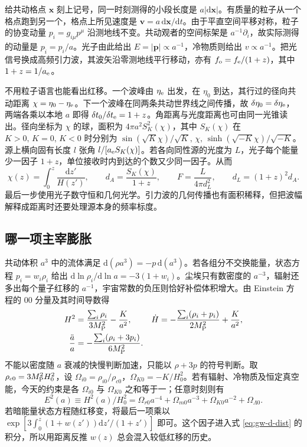 给共动格点 $\bm x$ 刻上记号，同一时刻测得的小段长度是 $a|\mathrm d\bm x|$。有质量的粒子从一个格点跑到另一个，格点上所见速度是 $\bm v=a\,\mathrm d\bm x/\mathrm dt$。由于平直空间平移对称，粒子的协变动量 $p_i=g_{i\mu}p^\mu$ 沿测地线不变。共动观者的空间标架是 $a^{-1}\partial_i$，故实际测得的动量是 $p_{\hat i}=p_i/a$。光子由此给出 $E=|\bm p|\propto a^{-1}$，冷物质则给出 $v\propto a^{-1}$。把光信号换成高频引力波，其波矢沿零测地线平行移动，亦有 $f_{\rm o}=f_{\rm e}/(1+z)$，其中 $1+z=1/a_{\rm e}$。

不用粒子语言也能看出红移。一个波峰由 $\eta_{\rm e}$ 出发，在 $\eta_0$ 到达，其行过的径向共动距离 $\chi=\eta_0-\eta_{\rm e}$。下一个波峰在同两条共动世界线之间传播，故 $\delta\eta_0=\delta\eta_{\rm e}$，两端各乘以本地 $a$ 即得 $\delta t_0/\delta t_{\rm e}=1+z$。角距离与光度距离也可由同一光锥读出。径向坐标为 $\chi$ 的球，面积为 $4\pi a^2 S_K^2(\chi)$，其中 $S_K(\chi)$ 在 $K>0,\,K=0,\,K<0$ 时分别为 $\sin(\sqrt K\chi)/\sqrt K,\,\chi,\,\sinh(\sqrt{-K}\chi)/\sqrt{-K}$。源上横向固有长度 $l$ 张角 $l/[a_{\rm e}S_K(\chi)]$。若各向同性源的光度为 $L$，光子每个能量少一因子 $1+z$，单位接收时内到达的个数又少同一因子。从而
\begin{equation}\label{eq:gw-d-dist}
 \chi(z)=\int_0^z\frac{\mathrm dz'}{H(z')},\qquad
 d_A=\frac{S_K(\chi)}{1+z},\qquad
 F=\frac{L}{4\pi d_L^2},\qquad d_L=(1+z)^2d_A .
\end{equation}
最后一步使用光子数守恒和几何光学。引力波的几何传播也有面积稀释，但把波幅解释成距离时还要处理源本身的频率标度。

\subsection{哪一项主宰膨胀}

共动体积 $a^3$ 中的流体满足 $\mathrm d(\rho a^3)=-p\,\mathrm d(a^3)$。若各组分不交换能量，状态方程 $p_i=w_i\rho_i$ 给出 $\mathrm d\ln\rho_i/\mathrm d\ln a=-3(1+w_i)$。尘埃只有数密度的 $a^{-3}$，辐射还多出每个量子红移的 $a^{-1}$，宇宙常数的负压则恰好补偿体积增大。由 Einstein 方程的 $00$ 分量及其时间导数得
\begin{align}
 H^2&=\frac{\sum_i\rho_i}{3M_{\rm P}^2}-\frac{K}{a^2},&
 \dot H&=-\frac{\sum_i(\rho_i+p_i)}{2M_{\rm P}^2}+\frac{K}{a^2},\nonumber\\
 \frac{\ddot a}{a}&=-\frac{\sum_i(\rho_i+3p_i)}{6M_{\rm P}^2}.
 \label{eq:gw-d-fried}
\end{align}
不能以密度随 $a$ 衰减的快慢判断加速，只能以 $\rho+3p$ 的符号判断。取 $\rho_{c0}=3M_{\rm P}^2 H_0^2$，设 $\Omega_{i0}=\rho_{i0}/\rho_{c0}$，$\Omega_{K0}=-K/H_0^2$。若有辐射、冷物质及恒定真空能，今天的约束是各 $\Omega_{i0}$ 与 $\Omega_{K0}$ 之和等于一；任意时刻则有
\[
 E^2(a)\equiv H^2(a)/H_0^2
 =\Omega_{r0}a^{-4}+\Omega_{m0}a^{-3}+\Omega_{K0}a^{-2}+\Omega_{\Lambda0}.
\]
若暗能量状态方程随红移变，将最后一项乘以 $\exp[3\int_0^z(1+w(z'))\mathrm dz'/(1+z')]$ 即可。这个因子进入式 \eqref{eq:gw-d-dist} 的积分，所以用距离反推 $w(z)$ 总会混入较低红移的历史。

